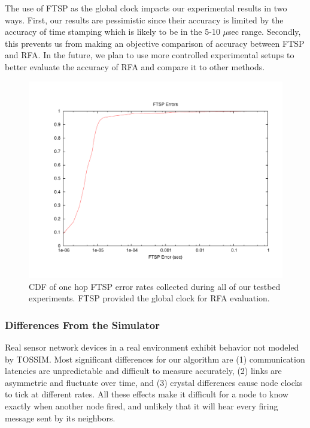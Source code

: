 \documentclass{sig-alternate}
\begin{document}
{The use of FTSP as the global clock impacts our experimental results
in two ways. First, our results are pessimistic since their accuracy
is limited by the accuracy of time stamping which is likely to be in
the 5-10 $\mu$sec range. Secondly, this prevents us from making an
objective comparison of accuracy between FTSP and RFA. In the future,
we plan to use more controlled experimental setups to better evaluate
the accuracy of RFA and compare it to other methods.

\begin{figure}
\begin{center}
\includegraphics[width=0.8\hsize]{./figures/FTSPERROR.pdf}
\end{center}
\caption {CDF of one hop FTSP error rates collected during all of our
testbed experiments. FTSP provided the global clock for RFA
evaluation.}
\label{FTSP-errors}
\end{figure}


\subsubsection{Differences From the Simulator}
\label{simulator-differences}

Real sensor network devices in a real environment exhibit behavior not
modeled by TOSSIM.  Most significant differences for our algorithm are
(1) communication latencies are unpredictable and difficult to measure
accurately, (2) links are asymmetric and fluctuate over time, and (3)
crystal differences cause node clocks to tick at different rates. All
these effects make it difficult for a node to know exactly when
another node fired, and unlikely that it will hear every firing
message sent by its neighbors.

}
\end{document}
